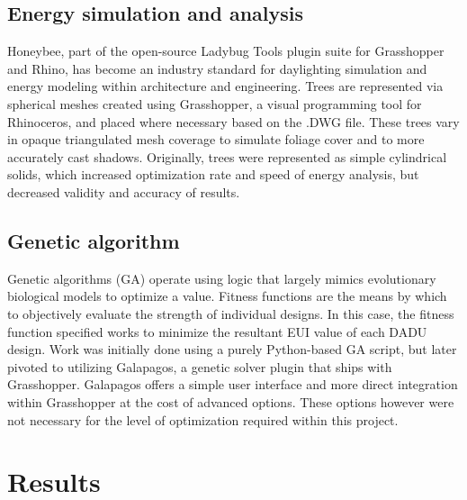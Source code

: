 \documentclass[sagev,doublespace,times,Review]{sagej}
\begin{document}
\subsection{Energy simulation and analysis}
Honeybee, part of the open-source Ladybug Tools plugin suite for Grasshopper and Rhino, has become an industry standard for daylighting simulation and energy modeling within architecture and engineering. 
Trees are represented via spherical meshes created using Grasshopper, a visual programming tool for Rhinoceros, and placed where necessary based on the .DWG file. These trees vary in opaque triangulated mesh coverage to simulate foliage cover and to more accurately cast shadows. Originally, trees were represented as simple cylindrical solids, which increased optimization rate and speed of energy analysis, but decreased validity and accuracy of results.

\subsection{Genetic algorithm}
Genetic algorithms (GA) operate using logic that largely mimics evolutionary biological models to optimize a value. Fitness functions are the means by which to objectively evaluate the strength of individual designs. In this case, the fitness function specified works to minimize the resultant EUI value of each DADU design. Work was initially done using a purely Python-based GA script, but later pivoted to utilizing Galapagos, a genetic solver plugin that ships with Grasshopper. Galapagos offers a simple user interface and more direct integration within Grasshopper at the cost of advanced options. These options however were not necessary for the level of optimization required within this project.

\section{Results}
\end{document}
